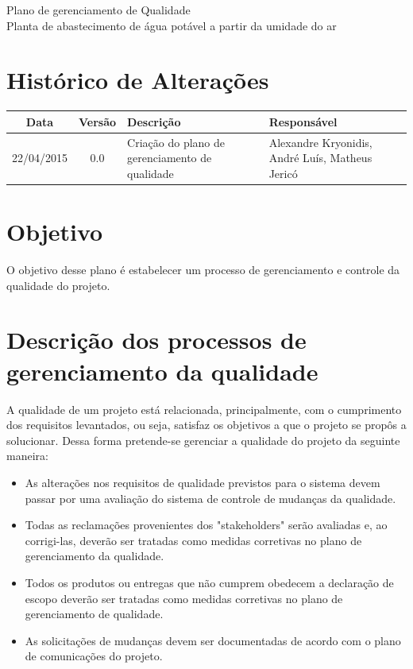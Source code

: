 % 
% 
% 
% 
% 
\begin{center}
 {\large Plano de gerenciamento de Qualidade}\\[0.2cm]
 {Planta de abastecimento de água potável a partir da umidade do ar}\\
 \end{center}
 
 \section*{Histórico de Alterações}
\begin{table}[h]
\centering
\begin{tabular}{|c|c|p{6cm}|p{5cm}|}
Data & Versão & Descrição & Responsável\\
\hline                               
22/04/2015 & 0.0 & Criação do plano de gerenciamento de qualidade & Alexandre Kryonidis, André Luís, Matheus Jericó\\
\hline
\end{tabular}
\end{table}

\section*{Objetivo}
	O objetivo desse plano é estabelecer um processo de gerenciamento e controle da qualidade do projeto.
        
\section*{Descrição dos processos de gerenciamento da qualidade}
	A qualidade de um projeto está relacionada, principalmente, com o cumprimento dos requisitos levantados, ou seja, satisfaz os objetivos a que o projeto se propôs a solucionar. Dessa forma pretende-se gerenciar a qualidade do projeto da seguinte maneira:
\begin{itemize}
\item As alterações nos requisitos de qualidade previstos para o sistema devem passar por uma avaliação do sistema de controle de mudanças da qualidade.
\item Todas as reclamações provenientes dos "stakeholders" serão avaliadas e, ao corrigi-las, deverão ser tratadas como medidas corretivas no plano de gerenciamento da qualidade.
\item Todos os produtos ou entregas que não cumprem obedecem a declaração de escopo deverão ser tratadas como medidas corretivas no plano de gerenciamento de qualidade.
\item As solicitações de mudanças devem ser documentadas de acordo com o plano de comunicações do projeto.
\end{itemize}

